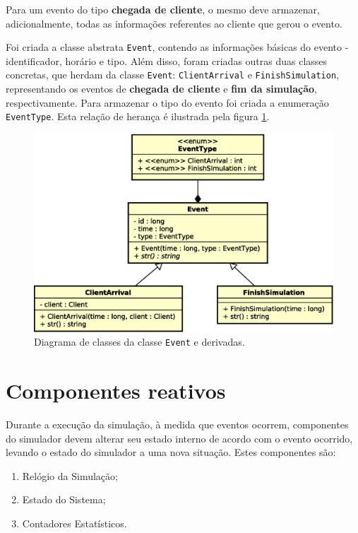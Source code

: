 Para um evento do tipo \textbf{chegada de cliente}, o mesmo deve armazenar,
adicionalmente, todas as informações referentes ao cliente que gerou o evento.

Foi criada a classe abstrata \texttt{Event}, contendo as informações básicas do
evento - identificador, horário e tipo. Além disso, foram criadas outras duas
classes concretas, que herdam da classe \texttt{Event}: \texttt{ClientArrival} e
\texttt{FinishSimulation}, representando os eventos de \textbf{chegada de
cliente} e \textbf{fim da simulação}, respectivamente. Para armazenar o tipo do
evento foi criada a enumeração \texttt{EventType}. Esta relação de herança é
ilustrada pela figura \ref{fig:diagram:events}.

\begin{figure}[htb!]
  \centering
  \includegraphics[scale=0.6]{img/Events}
  \caption{Diagrama de classes da classe \texttt{Event} e derivadas.}
\label{fig:diagram:events}
\end{figure}

\section{\label{model:reactive}Componentes reativos}

Durante a execução da simulação, à medida que eventos ocorrem, componentes do
simulador devem alterar seu estado interno de acordo com o evento ocorrido,
levando o estado do simulador a uma nova situação. Estes componentes são:

\begin{enumerate}
  \item Relógio da Simulação;
  \item Estado do Sistema;
  \item Contadores Estatísticos.
\end{enumerate}


